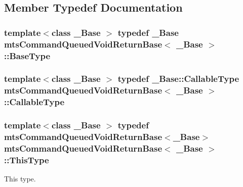 \subsection{Member Typedef Documentation}
\hypertarget{classmts_command_queued_void_return_base_a29c68cf6ce656cb59012c2e8086c8f8d}{
\subsubsection[{Base\-Type}]{\setlength{\rightskip}{0pt plus 5cm}template$<$class \-\_\-\-Base $>$ typedef \-\_\-\-Base {\bf mts\-Command\-Queued\-Void\-Return\-Base}$<$ \-\_\-\-Base $>$\-::{\bf Base\-Type}}}\label{classmts_command_queued_void_return_base_a29c68cf6ce656cb59012c2e8086c8f8d}
\hypertarget{classmts_command_queued_void_return_base_a66e6a106a0c17625d9f0ec9a33ff634a}{
\subsubsection[{Callable\-Type}]{\setlength{\rightskip}{0pt plus 5cm}template$<$class \-\_\-\-Base $>$ typedef \-\_\-\-Base\-::\-Callable\-Type {\bf mts\-Command\-Queued\-Void\-Return\-Base}$<$ \-\_\-\-Base $>$\-::{\bf Callable\-Type}}}\label{classmts_command_queued_void_return_base_a66e6a106a0c17625d9f0ec9a33ff634a}
\hypertarget{classmts_command_queued_void_return_base_a336bb46e1c968dc3003f9dc163c9f82c}{
\subsubsection[{This\-Type}]{\setlength{\rightskip}{0pt plus 5cm}template$<$class \-\_\-\-Base $>$ typedef {\bf mts\-Command\-Queued\-Void\-Return\-Base}$<$\-\_\-\-Base$>$ {\bf mts\-Command\-Queued\-Void\-Return\-Base}$<$ \-\_\-\-Base $>$\-::{\bf This\-Type}}}\label{classmts_command_queued_void_return_base_a336bb46e1c968dc3003f9dc163c9f82c}
This type. 

